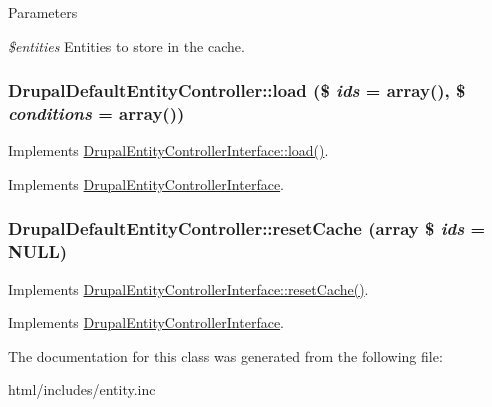 \begin{DoxyParams}{Parameters}
\item[{\em \$entities}]Entities to store in the cache. \end{DoxyParams}
\hypertarget{classDrupalDefaultEntityController_a523544ab73cba6994201afa89b0fb0c7}{
\subsubsection[{load}]{\setlength{\rightskip}{0pt plus 5cm}DrupalDefaultEntityController::load (\$ {\em ids} = {\ttfamily array()}, \/  \$ {\em conditions} = {\ttfamily array()})}}
\label{classDrupalDefaultEntityController_a523544ab73cba6994201afa89b0fb0c7}
Implements \hyperlink{interfaceDrupalEntityControllerInterface_acc6ec97b35f4d32680c0d2ba090f7389}{DrupalEntityControllerInterface::load()}. 

Implements \hyperlink{interfaceDrupalEntityControllerInterface_acc6ec97b35f4d32680c0d2ba090f7389}{DrupalEntityControllerInterface}.\hypertarget{classDrupalDefaultEntityController_a4d64a900a78ece5d4acc569000b69270}{
\subsubsection[{resetCache}]{\setlength{\rightskip}{0pt plus 5cm}DrupalDefaultEntityController::resetCache (array \$ {\em ids} = {\ttfamily NULL})}}
\label{classDrupalDefaultEntityController_a4d64a900a78ece5d4acc569000b69270}
Implements \hyperlink{interfaceDrupalEntityControllerInterface_ae735484b175ff431b7b104732b7a497b}{DrupalEntityControllerInterface::resetCache()}. 

Implements \hyperlink{interfaceDrupalEntityControllerInterface_ae735484b175ff431b7b104732b7a497b}{DrupalEntityControllerInterface}.

The documentation for this class was generated from the following file:\begin{DoxyCompactItemize}
\item 
html/includes/entity.inc\end{DoxyCompactItemize}
